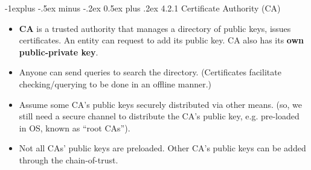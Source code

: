 \documentclass[10pt, landscape]{article}
\makeatletter
\renewcommand{\subsection}{\@startsection{subsection}{2}{0mm}%
                                {-1explus -.5ex minus -.2ex}%
                                {0.5ex plus .2ex}%
                                {\normalfont\normalsize\bfseries}}
\makeatother
\begin{document}
\begin{multicols*}{3}
\subsection{4.2.1 Certificate Authority (CA)}
\begin{itemize}
\item  \textbf{CA} is a trusted authority that manages a directory of public keys, issues certificates. An entity can request to add its public key. CA also has its \textbf{own public-private key}. 
\item Anyone can send queries to search the directory. (Certificates facilitate checking/querying to be done in an offline manner.)
\item Assume some CA’s public keys securely distributed via other means. (so, we still need a secure channel to distribute the CA’s public key, e.g. pre-loaded in OS, known as ``root CAs'').
\item Not all
CAs’ public keys are preloaded. Other CA’s public keys can be added through the chain-of-trust.
\end{itemize}


\end{multicols*}
\end{document}
